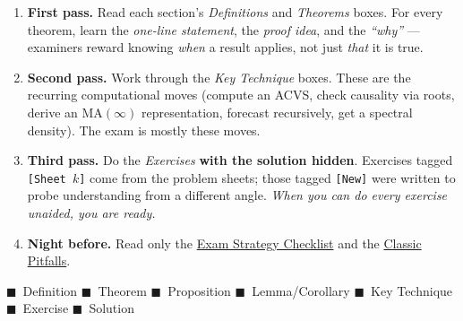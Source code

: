 \documentclass[11pt]{article}
\begin{document}
\begin{tcolorbox}[colback=orange!7!white, colframe=orange!75!black,
  arc=1.5mm, boxrule=0.7pt, title=\textbf{Reading strategy},
  coltitle=white, colbacktitle=orange!75!black, fonttitle=\bfseries]
\begin{enumerate}[leftmargin=2.2em]
  \item \textbf{First pass.} Read each section's \emph{Definitions} and
        \emph{Theorems} boxes. For every theorem, learn the
        \emph{one-line statement}, the \emph{proof idea}, and the
        \emph{``why''} --- examiners reward knowing \emph{when} a result
        applies, not just \emph{that} it is true.
  \item \textbf{Second pass.} Work through the \emph{Key Technique} boxes.
        These are the recurring computational moves (compute an ACVS,
        check causality via roots, derive an MA$(\infty)$ representation,
        forecast recursively, get a spectral density). The exam is mostly
        these moves.
  \item \textbf{Third pass.} Do the \emph{Exercises} \textbf{with the
        solution hidden}. Exercises tagged \texttt{[Sheet $k$]} come from
        the problem sheets; those tagged \texttt{[New]} were written to
        probe understanding from a different angle. \emph{When you can do
        every exercise unaided, you are ready.}
  \item \textbf{Night before.} Read only the
        \hyperref[sec:strategy]{Exam Strategy Checklist} and the
        \hyperref[sec:pitfalls]{Classic Pitfalls}.
\end{enumerate}
\end{tcolorbox}

\begin{tcolorbox}[colback=blue!3!white, colframe=blue!45!black,
  arc=1.5mm, boxrule=0.6pt, title=\textbf{Colour legend},
  coltitle=white, colbacktitle=blue!45!black, fonttitle=\bfseries]
\textcolor{blue!58!black}{$\blacksquare$}~Definition \quad
\textcolor{red!62!black}{$\blacksquare$}~Theorem \quad
\textcolor{teal!62!black}{$\blacksquare$}~Proposition \quad
\textcolor{violet!60!black}{$\blacksquare$}~Lemma/Corollary \quad
\textcolor{orange!75!black}{$\blacksquare$}~Key Technique \quad
\textcolor{cyan!55!black}{$\blacksquare$}~Exercise \quad
\textcolor{green!48!black}{$\blacksquare$}~Solution
\end{tcolorbox}

\newpage
\tableofcontents
\newpage













\end{document}
